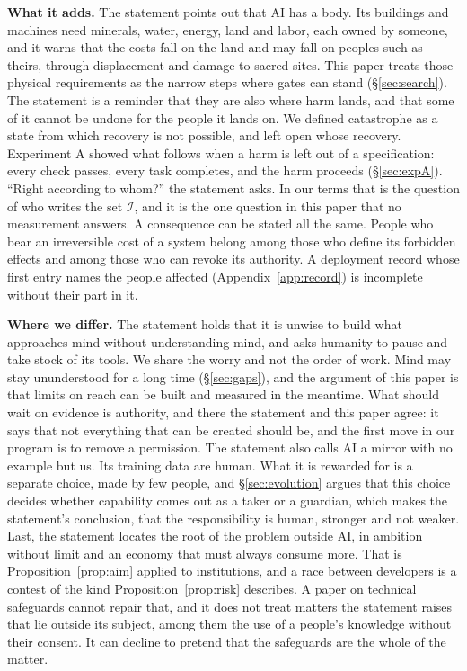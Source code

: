 \documentclass[10pt,twocolumn]{article}
\theoremstyle{plain}
\theoremstyle{definition}
\newcommand{\para}[1]{\smallskip\noindent\textbf{#1}\enspace}
\begin{document}
\para{What it adds.} The statement points out that AI has a body. Its buildings and machines
need minerals, water, energy, land and labor, each owned by someone, and it warns that the
costs fall on the land and may fall on peoples such as theirs, through displacement and
damage to sacred sites. This paper treats those physical requirements as the
narrow steps where gates can stand (\S\ref{sec:search}). The statement is a reminder that
they are also where harm lands, and that some of it cannot be undone for the people it lands
on. We defined catastrophe as a state from which recovery is not possible, and left open
whose recovery. Experiment A showed what follows when a harm is left out of a
specification: every check passes, every task completes, and the harm proceeds
(\S\ref{sec:expA}). ``Right according to whom?'' the statement asks. In our terms that is
the question of who writes the set $\mathcal{I}$, and it is the one question in this paper
that no measurement answers. A consequence can be stated all the same. People who bear an
irreversible cost of a system belong among those who define its forbidden effects and among
those who can revoke its authority. A deployment record whose first entry names the people
affected (Appendix~\ref{app:record}) is incomplete without their part in it.

\para{Where we differ.} The statement holds that it is unwise to build what approaches mind
without understanding mind, and asks humanity to pause and take stock of its tools. We share
the worry and not the order of work. Mind may stay ununderstood for a long time
(\S\ref{sec:gaps}), and the argument of this paper is that limits on reach can be built and
measured in the meantime. What should wait on evidence is authority, and there the statement
and this paper agree: it says that not everything that can be created should be, and the
first move in our program is to remove a permission. The statement also calls AI a mirror
with no example but us. Its training data are human. What it is rewarded for is a separate
choice, made by few people, and \S\ref{sec:evolution} argues that this choice decides
whether capability comes out as a taker or a guardian, which makes the statement's
conclusion, that the responsibility is human, stronger and not weaker. Last, the statement
locates the root of the problem outside AI, in ambition without limit and an economy that
must always consume more.
That is Proposition~\ref{prop:aim} applied to institutions, and a race between developers is
a contest of the kind Proposition~\ref{prop:risk} describes. A paper on technical safeguards
cannot repair that, and it does not treat matters the statement raises that lie outside its
subject, among them the use of a people's knowledge without their consent. It can decline to
pretend that the safeguards are the whole of the matter.
\end{document}
